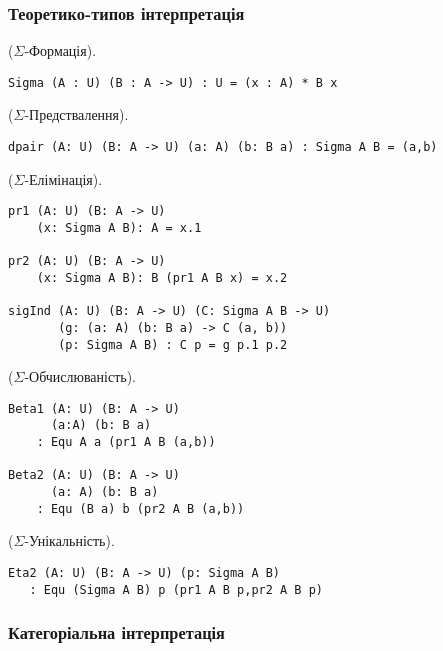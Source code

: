 \subsubsection{Теоретико-типов інтерпретація}

\begin{definition} ($\Sigma$-Формація).
\begin{lstlisting}
Sigma (A : U) (B : A -> U) : U = (x : A) * B x
\end{lstlisting}
\end{definition}

\begin{definition} ($\Sigma$-Предствалення).
\begin{lstlisting}
dpair (A: U) (B: A -> U) (a: A) (b: B a) : Sigma A B = (a,b)
\end{lstlisting}
\end{definition}

\begin{definition} ($\Sigma$-Елімінація).
\begin{lstlisting}
pr1 (A: U) (B: A -> U)
    (x: Sigma A B): A = x.1

pr2 (A: U) (B: A -> U)
    (x: Sigma A B): B (pr1 A B x) = x.2

sigInd (A: U) (B: A -> U) (C: Sigma A B -> U)
       (g: (a: A) (b: B a) -> C (a, b))
       (p: Sigma A B) : C p = g p.1 p.2
\end{lstlisting}
\end{definition}

\begin{theorem} ($\Sigma$-Обчислюваність).
\begin{lstlisting}
Beta1 (A: U) (B: A -> U)
      (a:A) (b: B a)
    : Equ A a (pr1 A B (a,b))

Beta2 (A: U) (B: A -> U)
      (a: A) (b: B a)
    : Equ (B a) b (pr2 A B (a,b))
\end{lstlisting}
\end{theorem}

\begin{theorem} ($\Sigma$-Унікальність).
\begin{lstlisting}
Eta2 (A: U) (B: A -> U) (p: Sigma A B)
   : Equ (Sigma A B) p (pr1 A B p,pr2 A B p)
\end{lstlisting}
\end{theorem}

\subsubsection{Категоріальна інтерпретація}

